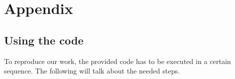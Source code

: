 \documentclass[10pt,a4paper]{article}
\begin{document}
	\section{Appendix}
		
		\subsection{Using the code}
		To reproduce our work, the provided code has to be executed in a certain sequence. The following will talk about the needed steps.

	\newpage
	
		
	
	
\end{document}

